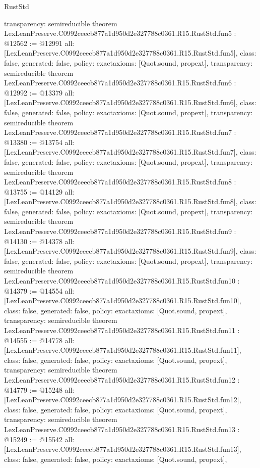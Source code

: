 \begin{lexlean}{RustStd}
\begin{coremodule}
{  transparency: semireducible
}
theorem LexLeanPreserve.C0992ceecb877a1d950d2e327788c0361.R15.RustStd.fun5 : @12562 := @12991 {
  all: [LexLeanPreserve.C0992ceecb877a1d950d2e327788c0361.R15.RustStd.fun5],
  class: false,
  generated: false,
  policy: exact{axioms: [Quot.sound, propext]},
  transparency: semireducible
}
theorem LexLeanPreserve.C0992ceecb877a1d950d2e327788c0361.R15.RustStd.fun6 : @12992 := @13379 {
  all: [LexLeanPreserve.C0992ceecb877a1d950d2e327788c0361.R15.RustStd.fun6],
  class: false,
  generated: false,
  policy: exact{axioms: [Quot.sound, propext]},
  transparency: semireducible
}
theorem LexLeanPreserve.C0992ceecb877a1d950d2e327788c0361.R15.RustStd.fun7 : @13380 := @13754 {
  all: [LexLeanPreserve.C0992ceecb877a1d950d2e327788c0361.R15.RustStd.fun7],
  class: false,
  generated: false,
  policy: exact{axioms: [Quot.sound, propext]},
  transparency: semireducible
}
theorem LexLeanPreserve.C0992ceecb877a1d950d2e327788c0361.R15.RustStd.fun8 : @13755 := @14129 {
  all: [LexLeanPreserve.C0992ceecb877a1d950d2e327788c0361.R15.RustStd.fun8],
  class: false,
  generated: false,
  policy: exact{axioms: [Quot.sound, propext]},
  transparency: semireducible
}
theorem LexLeanPreserve.C0992ceecb877a1d950d2e327788c0361.R15.RustStd.fun9 : @14130 := @14378 {
  all: [LexLeanPreserve.C0992ceecb877a1d950d2e327788c0361.R15.RustStd.fun9],
  class: false,
  generated: false,
  policy: exact{axioms: [Quot.sound, propext]},
  transparency: semireducible
}
theorem LexLeanPreserve.C0992ceecb877a1d950d2e327788c0361.R15.RustStd.fun10 : @14379 := @14554 {
  all: [LexLeanPreserve.C0992ceecb877a1d950d2e327788c0361.R15.RustStd.fun10],
  class: false,
  generated: false,
  policy: exact{axioms: [Quot.sound, propext]},
  transparency: semireducible
}
theorem LexLeanPreserve.C0992ceecb877a1d950d2e327788c0361.R15.RustStd.fun11 : @14555 := @14778 {
  all: [LexLeanPreserve.C0992ceecb877a1d950d2e327788c0361.R15.RustStd.fun11],
  class: false,
  generated: false,
  policy: exact{axioms: [Quot.sound, propext]},
  transparency: semireducible
}
theorem LexLeanPreserve.C0992ceecb877a1d950d2e327788c0361.R15.RustStd.fun12 : @14779 := @15248 {
  all: [LexLeanPreserve.C0992ceecb877a1d950d2e327788c0361.R15.RustStd.fun12],
  class: false,
  generated: false,
  policy: exact{axioms: [Quot.sound, propext]},
  transparency: semireducible
}
theorem LexLeanPreserve.C0992ceecb877a1d950d2e327788c0361.R15.RustStd.fun13 : @15249 := @15542 {
  all: [LexLeanPreserve.C0992ceecb877a1d950d2e327788c0361.R15.RustStd.fun13],
  class: false,
  generated: false,
  policy: exact{axioms: [Quot.sound, propext]},
}
\end{coremodule}
\end{lexlean}
